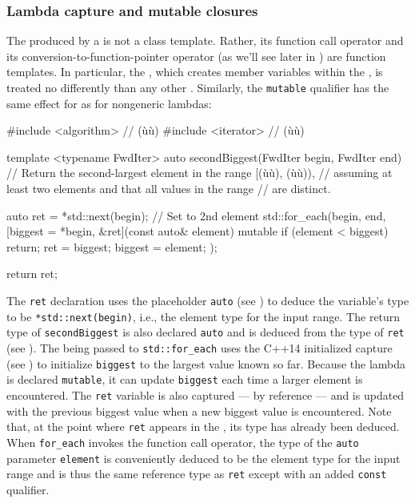 \subsubsection[Lambda capture and mutable closures]{Lambda capture and mutable closures}\label{lambda-capture-and-mutable-closures}

The  produced by a  is not a
class template. Rather, its function call operator and its
conversion-to-function-pointer operator (as we'll see later in ) are function templates. In
particular, the , which creates member variables
within the , is treated no differently than any
other . Similarly, the \lstinline!mutable!
qualifier has the same effect for  as for
nongeneric lambdas:

\begin{emcppslisting}[emcppsstandards={c++14}]
#include <algorithm>  // (ù{}ù)
#include <iterator>   // (ù{}ù)

template <typename FwdIter>
auto secondBiggest(FwdIter begin, FwdIter end)
    // Return the second-largest element in the range [(ù{}ù), (ù{}ù)),
    // assuming at least two elements and that all values in the range
    // are distinct.
{
    auto ret = *std::next(begin);  // Set to 2nd element
    std::for_each(begin, end,
        [biggest = *begin, &ret](const auto& element) mutable
        {
            if (element < biggest) { return; }
            ret = biggest;
            biggest = element;
        }
    );

    return ret;
}
\end{emcppslisting}
    

\noindent The \lstinline!ret! declaration uses the placeholder \lstinline!auto! (see
) to deduce the variable's type to be
\lstinline!*std::next(begin)!, i.e., the element type for the input range.
The return type of \lstinline!secondBiggest! is also declared \lstinline!auto!
and is deduced from the type of \lstinline!ret! (see
). The  being passed to
\lstinline!std::for_each! uses the C++14 initialized capture (see
) to initialize \lstinline!biggest! to the
largest value known so far. Because the lambda is declared
\lstinline!mutable!, it can update \lstinline!biggest! each time a larger
element is encountered. The \lstinline!ret! variable is also captured ---
by reference --- and is updated with the previous biggest value when a
new biggest value is encountered. Note that, at the point where
\lstinline!ret! appears in the , its type has
already been deduced. When \lstinline!for_each! invokes the function call
operator, the type of the \lstinline!auto! parameter \lstinline!element! is
conveniently deduced to be the element type for the input range and is
thus the same reference type as \lstinline!ret! except with an added
\lstinline!const! qualifier.

